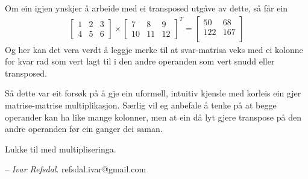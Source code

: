 \documentclass[12pt]{article}
\newcommand\x{\times}
\begin{document}
Om ein igjen ynskjer å arbeide med ei transposed utgåve av dette, så får ein
\begin{gather*}
\left[ 
\begin{array}{ccc}
1 & 2 & 3 \\
4 & 5 & 6
\end{array}
 \right] \x
\left[ 
\begin{array}{ccc}
7 & 8 & 9\\
10 & 11 & 12
\end{array}\right]^T
= 
\left[ 
\begin{array}{ccc}
50 & 68 \\
122 & 167 \\
\end{array}\right]
\end{gather*}
Og her kan det vera verdt å leggje merke til at svar-matrisa veks med ei
kolonne for kvar rad som vert lagt til i den andre operanden som 
vert snudd eller transposed.

Så dette var eit forsøk på å gje ein uformell, intuitiv kjensle med
korleis ein gjer matrise-matrise multiplikasjon. Særlig vil eg anbefale
å tenke på at begge operander kan ha like mange kolonner, men at ein då
lyt gjere transpose på den andre operanden før ein ganger dei saman.

Lukke til med multipliseringa.

-- \emph{Ivar Refsdal}. refsdal.ivar@gmail.com
\end{document}
